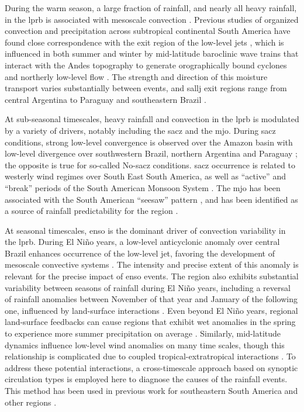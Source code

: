 \documentclass{ametsoc}
\begin{document}
During the warm season, a large fraction of rainfall, and nearly all heavy rainfall, in the \gls{lprb} is associated with mesoscale convection \citep{Velasco1987}.
Previous studies of organized convection and precipitation across subtropical continental South America have found close correspondence with the exit region of the low-level jets \citep{Velasco1987,Marengo2004,Saulo2007,Salio2007}, which is influenced in both summer and winter by mid-latitude baroclinic wave trains that interact with the Andes topography to generate orographically bound cyclones and northerly low-level flow \citep{Campetella2002,Seluchi2006,Boers2013,Boers2014}.
The strength and direction of this moisture transport varies substantially between events, and \gls{sallj} exit regions range from central Argentina \citep[``Chaco Jet Events'';][]{Salio2002} to Paraguay and southeastern Brazil \citep[``No-Chaco Jet Events'';][]{Vera2006}.

At sub-seasonal timescales, heavy rainfall and convection in the \gls{lprb} is modulated by a variety of drivers, notably including the \gls{sacz} and the \gls{mjo}.
During \gls{sacz} conditions, strong low-level convergence is observed over the Amazon basin with low-level divergence over southwestern Brazil, northern Argentina and Paraguay \citep{Herdies2002,Carvalho2010}; the opposite is true for so-called No-\gls{sacz} conditions.
\Gls{sacz} occurrence is related to westerly wind regimes over South East South America, as well as ``active'' and ``break'' periods of the South American Monsoon System \citep{Marengo2004}.
The \gls{mjo} has been associated with the South American ``seesaw'' pattern \citep{Nogues-Paegle1997,Paegle2000,Liebmann2004}, and has been identified as a source of rainfall predictability for the region \citep[e.g.][]{Munoz2015}.

At seasonal timescales, \gls{enso} is the dominant driver of convection variability in the \gls{lprb}.
During El Ni\~no years, a low-level anticyclonic anomaly over central Brazil enhances occurrence of the low-level jet, favoring the development of mesoscale convective systems \citep{Velasco1987}.
The intensity and precise extent of this anomaly is relevant for the precise impact of \gls{enso} events.
The region also exhibits substantial variability between seasons of rainfall during El Ni\~no years, including a reversal of rainfall anomalies between November of that year and January of the following one, influenced by land-surface interactions \citep{Grimm2003,Grimm2009}.
Even beyond El Ni\~no years, regional land-surface feedbacks can cause regions that exhibit wet anomalies in the spring to experience more summer precipitation on average \citep{Grimm2007}.
Similarly, mid-latitude dynamics influence low-level wind anomalies on many time scales, though this relationship is complicated due to coupled tropical-extratropical interactions \citep{Jones2002,Carvalho2004}.
To address these potential interactions, a cross-timescale approach based on synoptic circulation types is employed here to diagnose the causes of the rainfall events.
This method has been used in previous work for southeastern South America \citep{Munoz2015,Munoz2016} and other regions \citep{Moron2015}.
\end{document}

